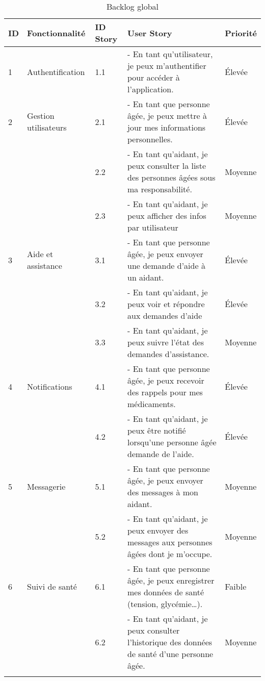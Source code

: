 \documentclass[12pt,a4paper]{report}
\begin{document}
\begin{longtable}{|p{1.5cm}|p{4cm}|p{1.5cm}|p{7cm}|p{1.5cm}|}
\hline
\textbf{ID} & \textbf{Fonctionnalité} & \textbf{ID Story} & \textbf{User Story} & \textbf{Priorité} \\
\hline
1 & Authentification & 1.1 &- En tant qu’utilisateur, je peux m’authentifier pour accéder à l’application. & Élevée \\
\hline
2 & Gestion utilisateurs & 2.1 &- En tant que personne âgée, je peux mettre à jour mes informations personnelles. & Élevée \\
& & 2.2 &- En tant qu’aidant, je peux consulter la liste des personnes âgées sous ma responsabilité. & Moyenne \\
& & 2.3 &- En tant qu’aidant, je peux afficher des infos par utilisateur & Moyenne \\
\hline
3 & Aide et assistance & 3.1 &- En tant que personne âgée, je peux envoyer une demande d’aide à un aidant. & Élevée \\
& & 3.2 &- En tant qu’aidant, je peux voir et répondre aux demandes d’aide & Élevée \\
& & 3.3 &- En tant qu’aidant, je peux suivre l’état des demandes d’assistance. & Moyenne \\
\hline
4 & Notifications & 4.1 & -	En tant que personne âgée, je peux recevoir des rappels pour mes médicaments. & Élevée \\
& & 4.2 & -	En tant qu’aidant, je peux être notifié lorsqu'une personne âgée demande de l’aide. & Élevée \\
\hline
5 & Messagerie & 5.1 & -	En tant que personne âgée, je peux envoyer des messages à mon aidant. & Moyenne \\
& & 5.2 & -	En tant qu’aidant, je peux envoyer des messages aux personnes âgées dont je m’occupe. & Moyenne \\
\hline
6 & Suivi de santé & 6.1 & -	En tant que personne âgée, je peux enregistrer mes données de santé (tension, glycémie…). & Faible \\
& & 6.2 & -	En tant qu’aidant, je peux consulter l’historique des données de santé d’une personne âgée. & Moyenne \\
\hline
\caption{Backlog global }
\label{backlog}
\end{longtable}
\end{document}
